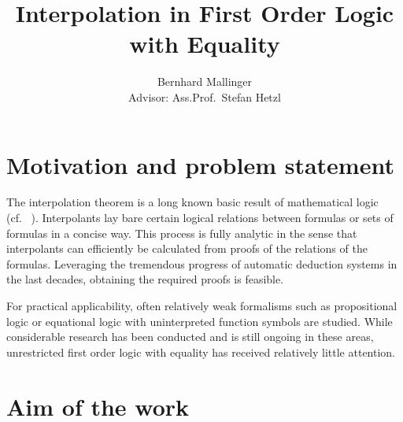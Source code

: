 \documentclass[,%
			paper=a4,%
			DIV11,
			liststotoc,
			bibtotoc,
			draft=false,%
			numbers=noendperiod
			]{scrartcl}
\title{Interpolation in First Order Logic with Equality}
\author{Bernhard Mallinger\medskip \\
Advisor: Ass.Prof.\ Stefan Hetzl}
\theoremstyle{definition}
\begin{document}
\maketitle

\section{Motivation and problem statement}
\label{motivation}


The interpolation theorem is a long known basic result of mathematical logic (cf.~ \cite{craig57linear}).  Interpolants lay bare certain logical relations between formulas or sets of formulas in a concise way. 
This process is fully analytic in the sense that interpolants can efficiently be calculated from proofs of the relations of the formulas.
Leveraging the tremendous progress of automatic deduction systems in the last decades, obtaining the required proofs is feasible.

For practical applicability, often relatively weak formalisms such as propositional logic or equational logic with uninterpreted function symbols are studied. 
While considerable research has been conducted and is still ongoing in these areas, unrestricted first order logic with equality has received relatively little attention. 





\begin{comment}
Software verification
Model checking
Derive invariants
interpolation by its nature disregards all but the predicates relevant to a certain property
can be used for predicate refinement in cegar

often restricted to weaker logics, application to more powerful formalisms such as fol with equality is relevant 
\end{comment}

\section{Aim of the work}

\end{document}

